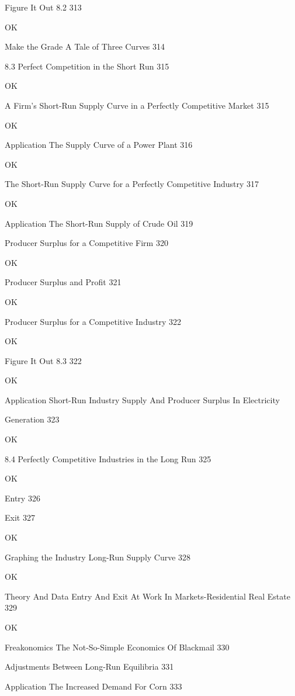Figure It Out 8.2 313

OK

Make the Grade A Tale of Three Curves 314



8.3 Perfect Competition in the Short Run 315

OK

A Firm's Short-Run Supply Curve in a Perfectly Competitive Market 315

OK

Application The Supply Curve of a Power Plant 316

OK

The Short-Run Supply Curve for a Perfectly Competitive Industry 317

OK

Application The Short-Run Supply of Crude Oil 319



Producer Surplus for a Competitive Firm 320

OK

Producer Surplus and Profit 321

OK

Producer Surplus for a Competitive Industry 322

OK

Figure It Out 8.3 322

OK

Application Short-Run Industry Supply And Producer Surplus In Electricity



Generation 323

OK

8.4 Perfectly Competitive Industries in the Long Run 325

OK

Entry 326



Exit 327

OK

Graphing the Industry Long-Run Supply Curve 328

OK

Theory And Data Entry And Exit At Work In Markets-Residential Real Estate 329

OK

Freakonomics The Not-So-Simple Economics Of Blackmail 330



Adjustments Between Long-Run Equilibria 331



Application The Increased Demand For Corn 333

